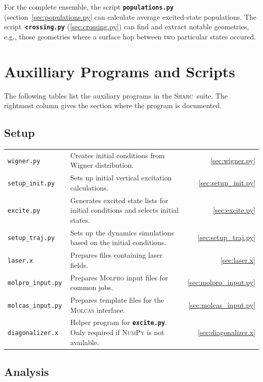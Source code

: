 \documentclass[a4paper,11pt,DIV=15,openany,twoside=false]{scrbook}
\newcommand{\sharc}{\textsc{Sharc}}
\newcommand{\ttt}[1]{\textbf{\texttt{#1}}}
\begin{document}
For the complete ensemble, the script \ttt{populations.py} (section~\ref{sec:populations.py} can calculate average excited-state populations. The script~\ttt{crossing.py} (\ref{sec:crossing.py}) can find and extract notable geometries, e.g., those geometries where a surface hop between two particular states occured.

\section{Auxilliary Programs and Scripts}

The following tables list the auxiliary programs in the \sharc\ suite. The rightmost column gives the section where the program is documented.

\subsection{Setup}

\begin{tabular}{>{\tt}lp{9.5cm}r}
  wigner.py             &Creates initial conditions from Wigner distribution.                   &\ref{sec:wigner.py}\\
  setup\_init.py        &Sets up initial vertical excitation calculations.                              &\ref{sec:setup_init.py}\\
  excite.py             &Generates excited state lists for initial conditions and selects initial states.                                            &\ref{sec:excite.py}\\
  setup\_traj.py        &Sets up the dynamics simulations based on the initial conditions.      &\ref{sec:setup_traj.py}\\
  laser.x               &Prepares files containing laser fields.                                &\ref{sec:laser.x}\\
  molpro\_input.py      &Prepares \textsc{Molpro} input files for common jobs.                  &\ref{sec:molpro_input.py}\\
  molcas\_input.py      &Prepares template files for the \textsc{Molcas} interface.             &\ref{sec:molcas_input.py}\\
  diagonalizer.x        &Helper program for \ttt{excite.py}. Only required if \textsc{NumPy} is not available.            &\ref{sec:diagonalizer.x}\\
\end{tabular}

\subsection{Analysis}
\end{document}
